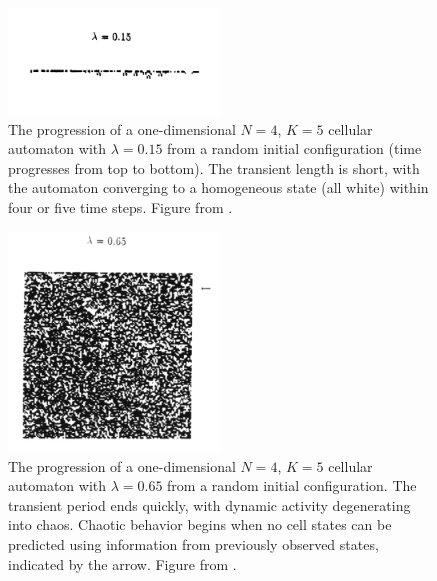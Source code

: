 \documentclass[a4paper,11pt]{article}
\begin{document}
\begin{figure}[htp]
\centering
\includegraphics[width=0.5\textwidth]{ordered_transient.png}
\caption[Ordered CA Transient Length]{
The progression of a one-dimensional $N=4$, $K=5$ cellular automaton with $\lambda=0.15$ from a random initial configuration (time progresses from top to bottom). The transient length is short, with the automaton converging to a homogeneous state (all white) within four or five time steps. Figure from \citeauthor{la90} \cite{la90}.
}
\label{fig:order_trans}
\end{figure}

\begin{figure}[htp]
\centering
\includegraphics[width=0.5\textwidth]{chaos_transient.png}
\caption[Chaotic CA Transient Length]{
The progression of a one-dimensional $N=4$, $K=5$ cellular automaton with $\lambda=0.65$ from a random initial configuration. The transient period ends quickly, with dynamic activity degenerating into chaos. Chaotic behavior begins when no cell states can be predicted using information from previously observed states, indicated by the arrow. Figure from \citeauthor{la90} \cite{la90}.
}
\label{fig:chaos_trans}
\end{figure}
\end{document}
